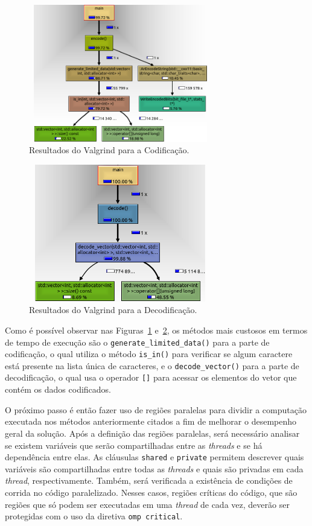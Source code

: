 \begin{figure}[t]
    \centering
    \includegraphics[width=8cm, height=6cm]{Images/ValgrindEncode.png}
    \caption{Resultados do Valgrind para a Codificação.}
    \label{fig:valenc}
\end{figure}

\begin{figure}[t]
    \centering
    \includegraphics[width=8cm, height=6cm]{Images/ValgrindDecode.png}
    \caption{Resultados do Valgrind para a Decodificação.}
    \label{fig:valdec}
\end{figure}

Como é possível observar nas Figuras~\ref{fig:valenc} e~\ref{fig:valdec}, os métodos mais custosos em termos de tempo de execução são o \texttt{generate\_limited\_data()} para a parte de codificação, o qual utiliza o método \texttt{is\_in()} para verificar se algum caractere está presente na lista única de caracteres, e o \texttt{decode\_vector()} para a parte de decodificação, o qual usa o operador \texttt{[]} para acessar os elementos do vetor que contém os dados codificados.

O próximo passo é então fazer uso de regiões paralelas para dividir a computação executada nos métodos anteriormente citados a fim de melhorar o desempenho geral da solução. Após a definição das regiões paralelas, será necessário analisar se existem variáveis que serão compartilhadas entre as \textit{threads} e se há dependência entre elas. As cláusulas \texttt{shared} e \texttt{private} permitem descrever quais variáveis são compartilhadas entre todas as \textit{threads} e quais são privadas em cada \textit{thread}, respectivamente. Também, será verificada a existência de condições de corrida no código paralelizado. Nesses casos, regiões críticas do código, que são regiões que só podem ser executadas em uma \textit{thread} de cada vez, deverão ser protegidas com o uso da diretiva \texttt{omp critical}.

